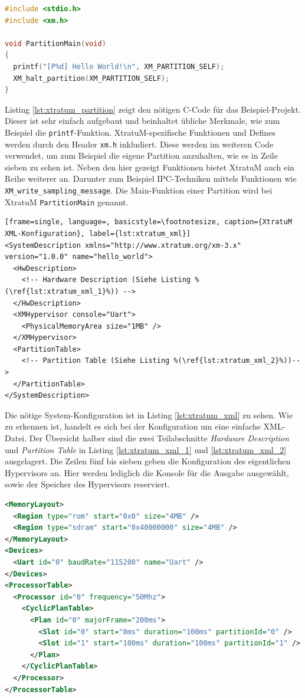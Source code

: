 \documentclass[
  a4paper,					    %
  twoside,
  DIV=calc,     				%
  bibliography=totoc,
  cleardoublepage=empty,
  ngerman,     					%
  final       					%
]{scrbook}
\begin{document}
\begin{lstlisting}[frame=single, language=C, basicstyle=\footnotesize, caption={XtratuM Beispiel Partition}, label={lst:xtratum_partition}]
#include <stdio.h>
#include <xm.h>

void PartitionMain(void)
{
  printf("[P%d] Hello World!\n", XM_PARTITION_SELF);
  XM_halt_partition(XM_PARTITION_SELF);
}
\end{lstlisting}

Listing \ref{lst:xtratum_partition} zeigt den nötigen C-Code für das Beispiel-Projekt. Dieser ist sehr einfach aufgebaut und beinhaltet übliche Merkmale, wie zum Beispiel die \texttt{printf}-Funktion. XtratuM-spezifische Funktionen und Defines werden durch den Header \texttt{xm.h} inkludiert. Diese werden im weiteren Code verwendet, um zum Beispiel die eigene Partition anzuhalten, wie es in Zeile sieben zu sehen ist. Neben den hier gezeigt Funktionen bietet XtratuM auch ein Reihe weiterer an. Darunter zum Beispiel IPC-Techniken mittels Funktionen wie \texttt{XM\_write\_sampling\_message}. Die Main-Funktion einer Partition wird bei XtratuM \texttt{PartitionMain} genannt.

\begin{lstlisting}[frame=single, language=, basicstyle=\footnotesize, caption={XtratuM XML-Konfiguration}, label={lst:xtratum_xml}]
<SystemDescription xmlns="http://www.xtratum.org/xm-3.x" version="1.0.0" name="hello_world">
  <HwDescription>
    <!-- Hardware Description (Siehe Listing %(\ref{lst:xtratum_xml_1}%)) -->
  </HwDescription>
  <XMHypervisor console="Uart">
    <PhysicalMemoryArea size="1MB" />
  </XMHypervisor>
  <PartitionTable>
    <!-- Partition Table (Siehe Listing %(\ref{lst:xtratum_xml_2}%))-->
  </PartitionTable>
</SystemDescription>
\end{lstlisting}

Die nötige System-Konfiguration ist in Listing \ref{lst:xtratum_xml} zu sehen. Wie zu erkennen ist, handelt es sich bei der Konfiguration um eine einfache XML-Datei. Der Übersicht halber sind die zwei Teilabschnitte \emph{Hardware Description} und \emph{Partition Table} in Listing \ref{lst:xtratum_xml_1} und \ref{lst:xtratum_xml_2} ausgelagert. Die Zeilen fünf bis sieben geben die Konfiguration des eigentlichen Hypervisors an. Hier werden lediglich die Konsole für die Ausgabe ausgewählt, sowie der Speicher des Hypervisors reserviert.

\begin{lstlisting}[frame=single, language=XML, basicstyle=\footnotesize, caption={XtratuM Hardware Description}, label={lst:xtratum_xml_1}]
<MemoryLayout>
  <Region type="rom" start="0x0" size="4MB" />
  <Region type="sdram" start="0x40000000" size="4MB" />
</MemoryLayout>
<Devices>
  <Uart id="0" baudRate="115200" name="Uart" />
</Devices>
<ProcessorTable>
  <Processor id="0" frequency="50Mhz">
    <CyclicPlanTable>
      <Plan id="0" majorFrame="200ms">
        <Slot id="0" start="0ms" duration="100ms" partitionId="0" />
        <Slot id="1" start="100ms" duration="100ms" partitionId="1" />
      </Plan>
    </CyclicPlanTable>
  </Processor>
</ProcessorTable>
\end{lstlisting}
\end{document}
